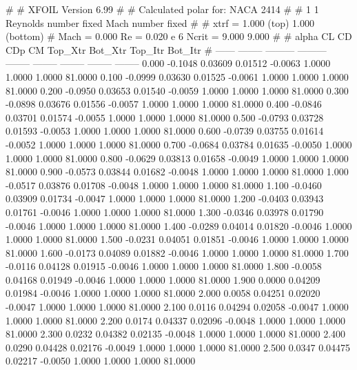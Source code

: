 #  
#       XFOIL         Version 6.99
#  
# Calculated polar for: NACA 2414                                       
#  
# 1 1 Reynolds number fixed          Mach number fixed         
#  
# xtrf =   1.000 (top)        1.000 (bottom)  
# Mach =   0.000     Re =     0.020 e 6     Ncrit =   9.000  9.000
#  
#   alpha    CL        CD       CDp       CM     Top_Xtr  Bot_Xtr  Top_Itr  Bot_Itr
#  ------ -------- --------- --------- -------- -------- -------- -------- --------
   0.000  -0.1048   0.03609   0.01512  -0.0063   1.0000   1.0000   1.0000  81.0000
   0.100  -0.0999   0.03630   0.01525  -0.0061   1.0000   1.0000   1.0000  81.0000
   0.200  -0.0950   0.03653   0.01540  -0.0059   1.0000   1.0000   1.0000  81.0000
   0.300  -0.0898   0.03676   0.01556  -0.0057   1.0000   1.0000   1.0000  81.0000
   0.400  -0.0846   0.03701   0.01574  -0.0055   1.0000   1.0000   1.0000  81.0000
   0.500  -0.0793   0.03728   0.01593  -0.0053   1.0000   1.0000   1.0000  81.0000
   0.600  -0.0739   0.03755   0.01614  -0.0052   1.0000   1.0000   1.0000  81.0000
   0.700  -0.0684   0.03784   0.01635  -0.0050   1.0000   1.0000   1.0000  81.0000
   0.800  -0.0629   0.03813   0.01658  -0.0049   1.0000   1.0000   1.0000  81.0000
   0.900  -0.0573   0.03844   0.01682  -0.0048   1.0000   1.0000   1.0000  81.0000
   1.000  -0.0517   0.03876   0.01708  -0.0048   1.0000   1.0000   1.0000  81.0000
   1.100  -0.0460   0.03909   0.01734  -0.0047   1.0000   1.0000   1.0000  81.0000
   1.200  -0.0403   0.03943   0.01761  -0.0046   1.0000   1.0000   1.0000  81.0000
   1.300  -0.0346   0.03978   0.01790  -0.0046   1.0000   1.0000   1.0000  81.0000
   1.400  -0.0289   0.04014   0.01820  -0.0046   1.0000   1.0000   1.0000  81.0000
   1.500  -0.0231   0.04051   0.01851  -0.0046   1.0000   1.0000   1.0000  81.0000
   1.600  -0.0173   0.04089   0.01882  -0.0046   1.0000   1.0000   1.0000  81.0000
   1.700  -0.0116   0.04128   0.01915  -0.0046   1.0000   1.0000   1.0000  81.0000
   1.800  -0.0058   0.04168   0.01949  -0.0046   1.0000   1.0000   1.0000  81.0000
   1.900   0.0000   0.04209   0.01984  -0.0046   1.0000   1.0000   1.0000  81.0000
   2.000   0.0058   0.04251   0.02020  -0.0047   1.0000   1.0000   1.0000  81.0000
   2.100   0.0116   0.04294   0.02058  -0.0047   1.0000   1.0000   1.0000  81.0000
   2.200   0.0174   0.04337   0.02096  -0.0048   1.0000   1.0000   1.0000  81.0000
   2.300   0.0232   0.04382   0.02135  -0.0048   1.0000   1.0000   1.0000  81.0000
   2.400   0.0290   0.04428   0.02176  -0.0049   1.0000   1.0000   1.0000  81.0000
   2.500   0.0347   0.04475   0.02217  -0.0050   1.0000   1.0000   1.0000  81.0000
